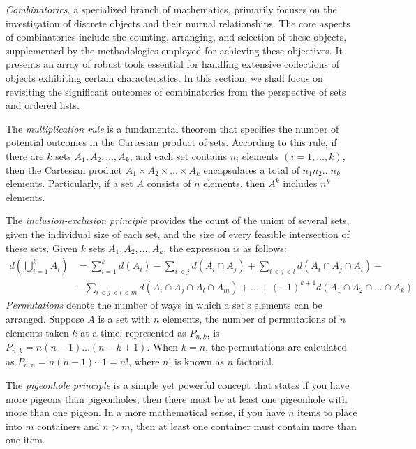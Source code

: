 \emph{Combinatorics}, a specialized branch of mathematics, primarily focuses on the investigation of discrete objects and their mutual relationships. The core aspects of combinatorics include the counting, arranging, and selection of these objects, supplemented by the methodologies employed for achieving these objectives. It presents an array of robust tools essential for handling extensive collections of objects exhibiting certain characteristics. In this section, we shall focus on revisiting the significant outcomes of combinatorics from the perspective of sets and ordered lists.

The \emph{multiplication rule} is a fundamental theorem that specifies the number of potential outcomes in the Cartesian product of sets. According to this rule, if there are $k$ sets $A_1, A_2, \ldots, A_k$, and each set contains $n_i$ elements $\left( i=1, \ldots, k \right)$, then the Cartesian product $A_1 \times A_2 \times \ldots \times A_k$ encapsulates a total of $n_1 n_2 \ldots n_k$ elements. Particularly, if a set $A$ consists of $n$ elements, then $A^k$ includes $n^k$ elements.

The \emph{inclusion-exclusion principle} provides the count of the union of several sets, given the individual size of each set, and the size of every feasible intersection of these sets. Given $k$ sets $A_1, A_2, \ldots, A_k$, the expression is as follows:
\begin{equation*}
\begin{split}
d \left( \bigcup_{i=1}^k A_i \right) & = \sum_{i=1}^k d \left( A_i \right) - \sum_{i<j} d \left( A_i \cap A_j \right) + \sum_{i<j<l} d \left( A_i \cap A_j \cap A_l \right) - \\
& - \sum_{i<j<l<m} d \left( A_i \cap A_j \cap A_l \cap A_m \right) + \ldots +  (-1)^{k+1} d \left( A_1 \cap A_2 \cap \ldots \cap A_k \right) 
\end{split}
\end{equation*}
\emph{Permutations} denote the number of ways in which a set's elements can be arranged. Suppose $A$ is a set with $n$ elements, the number of permutations of $n$ elements taken $k$ at a time, represented as $P_{n,k}$, is $P_{n,k} = n \left( n-1 \right) \ldots \left( n-k+1 \right)$. When $k=n$, the permutations are calculated as $P_{n,n} = n \left( n-1 \right) \cdots 1=n!$, where $n!$ is known as $n$ factorial.

The \emph{pigeonhole principle} is a simple yet powerful concept that states if you have more pigeons than pigeonholes, then there must be at least one pigeonhole with more than one pigeon. In a more mathematical sense, if you have $n$ items to place into $m$ containers and $n>m$, then at least one container must contain more than one item.

